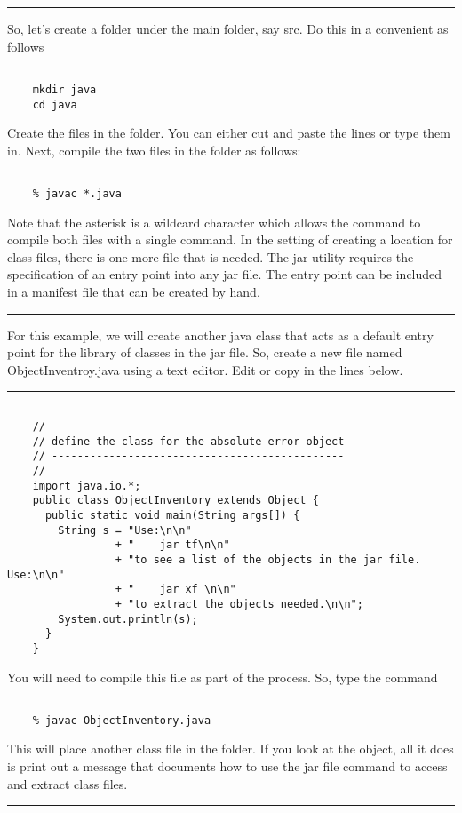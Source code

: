 \documentclass[10pt,fleqn]{article}
\begin{document}
\vskip0.1in\hrule\vskip0.1in
\noindent
So, let's create a folder under the main folder, say src. Do this in a
convenient as follows
\begin{verbatim}

    mkdir java
    cd java

\end{verbatim}
Create the files in the folder. You can either cut and paste the lines or type
them in. Next, compile the two files in the folder as follows:
\begin{verbatim}

    % javac *.java

\end{verbatim}
Note that the asterisk is a wildcard character which allows the command to
compile both files with a single command. In the setting of creating a location
for class files, there is one more file that is needed. The jar utility requires
the specification of an entry point into any jar file. The entry point can be
included in a manifest file that can be created by hand. 
\vskip0.1in\hrule\vskip0.1in
\noindent
For this example, we will create another java class that acts as a default
entry point for the library of classes in the jar file. So, create a new file
named ObjectInventroy.java using a text editor. Edit or copy in the lines
below.
\vskip0.1in\hrule\vskip0.1in
\begin{verbatim}

    //
    // define the class for the absolute error object
    // ----------------------------------------------
    //
    import java.io.*;
    public class ObjectInventory extends Object {
      public static void main(String args[]) {
        String s = "Use:\n\n"
                 + "    jar tf\n\n"
                 + "to see a list of the objects in the jar file. Use:\n\n"
                 + "    jar xf \n\n"
                 + "to extract the objects needed.\n\n";
        System.out.println(s);
      }
    }

\end{verbatim}
You will need to compile this file as part of the process. So, type the command
\begin{verbatim}

    % javac ObjectInventory.java

\end{verbatim}
This will place another class file in the folder. If you look at the object, all
it does is print out a message that documents how to use the jar file command to
access and extract class files.
\vskip0.1in\hrule\vskip0.1in
\end{document}
